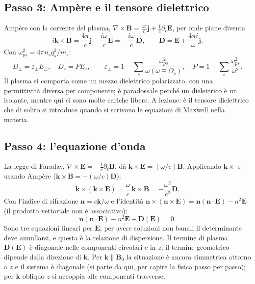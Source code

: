 \subsection{Passo 3: Amp\`ere e il tensore dielettrico}
Amp\`ere con la corrente del plasma, $\nabla\times\mathbf{B}=\frac{4\pi}{c}\mathbf{j}+\frac1c\partial_t\mathbf{E}$, per onde piane diventa
\begin{equation}
i\mathbf{k}\times\mathbf{B}=\frac{4\pi}{c}\mathbf{j}-\frac{i\omega}{c}\mathbf{E}=-\frac{i\omega}{c}\,\mathbf{D},\qquad\mathbf{D}=\mathbf{E}+\frac{4\pi i}{\omega}\mathbf{j} .
\end{equation}
Con $\omega_{ps}^2=4\pi n_sq_s^2/m_s$:
\begin{equation}
D_\pm=\varepsilon_\pm E_\pm,\quad D_z=PE_z,\qquad\varepsilon_\pm=1-\sum_s\frac{\omega_{ps}^2}{\omega(\omega\mp\Omega_s)},\quad P=1-\sum_s\frac{\omega_{ps}^2}{\omega^2}.
\end{equation}
Il plasma si comporta come un mezzo dielettrico polarizzato, con una permittività diversa per componente; è paradossale perché un dielettrico è un isolante, mentre qui ci sono molte cariche libere. A lezione: è il tensore dielettrico che di solito si introduce quando si scrivono le equazioni di Maxwell nella materia.

\subsection{Passo 4: l'equazione d'onda}
La legge di Faraday, $\nabla\times\mathbf{E}=-\frac1c\partial_t\mathbf{B}$, dà $\mathbf{k}\times\mathbf{E}=(\omega/c)\mathbf{B}$. Applicando $\mathbf{k}\times$ e usando Amp\`ere ($\mathbf{k}\times\mathbf{B}=-(\omega/c)\mathbf{D}$):
\begin{equation}
\mathbf{k}\times(\mathbf{k}\times\mathbf{E})=\frac\omega c\,\mathbf{k}\times\mathbf{B}=-\frac{\omega^2}{c^2}\mathbf{D}.
\end{equation}
Con l'indice di rifrazione $\mathbf{n}=c\mathbf{k}/\omega$ e l'identità $\mathbf{n}\times(\mathbf{n}\times\mathbf{E})=\mathbf{n}(\mathbf{n}\cdot\mathbf{E})-n^2\mathbf{E}$ (il prodotto vettoriale non è associativo):
\begin{equation}
\mathbf{n}(\mathbf{n}\cdot\mathbf{E})-n^2\mathbf{E}+\mathbf{D}(\mathbf{E})=0.
\end{equation}
Sono tre equazioni lineari per $\mathbf{E}$; per avere soluzioni non banali il determinante deve annullarsi, e questa è la relazione di dispersione. Il termine di plasma $\mathbf{D}(\mathbf{E})$ è diagonale nelle componenti circolari e in $z$; il termine geometrico dipende dalla direzione di $\mathbf{k}$. Per $\mathbf{k}\parallel\mathbf{B}_0$ la situazione è ancora simmetrica attorno a $z$ e il sistema è diagonale (si parte da qui, per capire la fisica passo per passo); per $\mathbf{k}$ obliquo $z$ si accoppia alle componenti trasverse.

